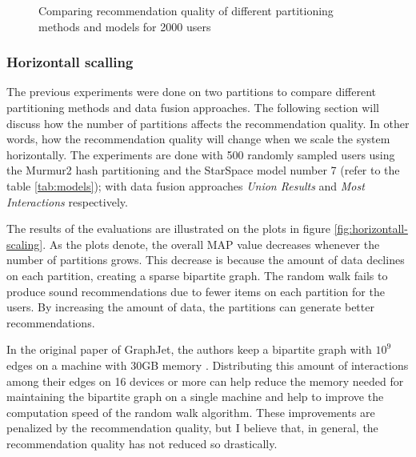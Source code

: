 \begin{figure}[!h]
    \centering
    
    \caption{Comparing recommendation quality of different partitioning methods and models for 2000 users}
    \label{plot:hyperparameter-recommendation-quality-2000-users}
\end{figure}



\subsubsection{Horizontall scalling}
\label{subsubsec:eval-horizontall-scalling}
The previous experiments were done on two partitions to compare different partitioning methods and data fusion approaches. The following section will discuss how the number of partitions affects the recommendation quality. In other words, how the recommendation quality will change when we scale the system horizontally. The experiments are done with 500 randomly sampled users using the Murmur2 hash partitioning and the StarSpace model number 7 (refer to the table \ref{tab:models}); with data fusion approaches \emph{Union Results} and \emph{Most Interactions} respectively.


The results of the evaluations are illustrated on the plots in figure \ref{fig:horizontall-scaling}. As the plots denote, the overall MAP value decreases whenever the number of partitions grows. This decrease is because the amount of data declines on each partition, creating a sparse bipartite graph. The random walk fails to produce sound recommendations due to fewer items on each partition for the users. By increasing the amount of data, the partitions can generate better recommendations. 


In the original paper of GraphJet, the authors keep a bipartite graph with $10^9$ edges on a machine with 30GB memory \cite{sharmaGraphJetRealtimeContent2016}. Distributing this amount of interactions among their edges on 16 devices or more can help reduce the memory needed for maintaining the bipartite graph on a single machine and help to improve the computation speed of the random walk algorithm. These improvements are penalized by the recommendation quality, but I believe that, in general, the recommendation quality has not reduced so drastically.

